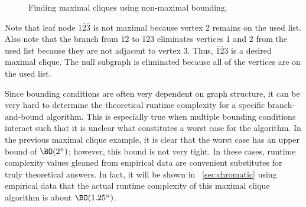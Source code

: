 \begin{figure}[H]
  \centering
  \caption{Finding maximal cliques using non-maximal bounding.}
  \label{fig:boundnonmax}
\end{figure}

Note that leaf node \(1\bar{2}\bar{3}\) is not maximal because vertex \(2\) remains on the used list.  Also note
that the branch from \(\bar{1}\bar{2}\) to \(\bar{1}\bar{2}3\) eliminates vertices \(1\) and \(2\) from the used
list because they are not adjacent to vertex \(3\).  Thus, \(\bar{1}\bar{2}3\) is a desired maximal clique.  The
null subgraph is eliminated because all of the vertices are on the used list.

Since bounding conditions are often very dependent on graph structure, it can be very hard to determine the
theoretical runtime complexity for a specific branch-and-bound algorithm.  This is especially true when multiple
bounding conditions interact such that it is unclear what constitutes a worst case for the algorithm.  In the
previous maximal clique example, it is clear that the worst case has an upper bound of \(\BO(2^n)\); however, this
bound is not very tight.  In these cases, runtime complexity values gleaned from empirical data are convenient
substitutes for truly theoretical answers.  In fact, it will be shown in \sectionname~\ref{sec:chromatic} using
empirical data that the actual runtime complexity of this maximal clique algorithm is about \(\BO(1.25^n)\).

